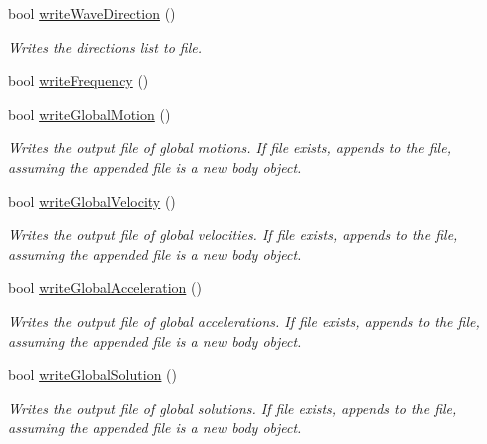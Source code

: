 \begin{DoxyCompactItemize}
bool \hyperlink{class_file_writer_a0428a4f8ad72d01ff5316bfa3e4ce631}{write\-Wave\-Direction} ()
\begin{DoxyCompactList}\small\item\em Writes the directions list to file. \end{DoxyCompactList}\item 
bool \hyperlink{class_file_writer_ac6df31af71020a41adb6ecd6ff136532}{write\-Frequency} ()
\item 
bool \hyperlink{class_file_writer_a5c921b5ae92039cf50458e2c46e204da}{write\-Global\-Motion} ()
\begin{DoxyCompactList}\small\item\em Writes the output file of global motions. If file exists, appends to the file, assuming the appended file is a new body object. \end{DoxyCompactList}\item 
bool \hyperlink{class_file_writer_a2078a50dbd21946aeed86d8e0bccd50e}{write\-Global\-Velocity} ()
\begin{DoxyCompactList}\small\item\em Writes the output file of global velocities. If file exists, appends to the file, assuming the appended file is a new body object. \end{DoxyCompactList}\item 
bool \hyperlink{class_file_writer_aaff553c2e03cb1c1639e107cfeac3038}{write\-Global\-Acceleration} ()
\begin{DoxyCompactList}\small\item\em Writes the output file of global accelerations. If file exists, appends to the file, assuming the appended file is a new body object. \end{DoxyCompactList}\item 
bool \hyperlink{class_file_writer_a317649499b8c16dd529e2bf588e3be88}{write\-Global\-Solution} ()
\begin{DoxyCompactList}\small\item\em Writes the output file of global solutions. If file exists, appends to the file, assuming the appended file is a new body object. \end{DoxyCompactList}\end{DoxyCompactItemize}

